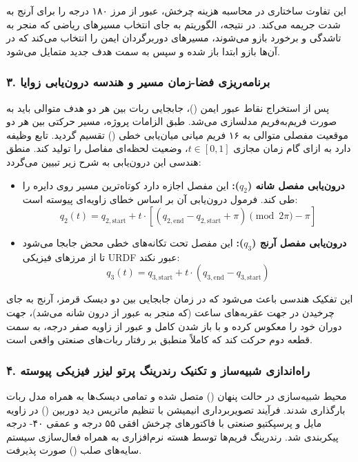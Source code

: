 \documentclass{article}
\begin{document}
این تفاوت ساختاری در محاسبه هزینه چرخش، عبور از مرز ۱۸۰ درجه را برای آرنج به شدت جریمه می‌کند. در نتیجه، الگوریتم به جای انتخاب مسیرهای ریاضی که منجر به تاشدگی و برخورد بازو می‌شوند، مسیرهای دوربرگردان ایمن را انتخاب می‌کند که در آن‌ها بازو ابتدا باز شده و سپس به سمت هدف جدید متمایل می‌شود.

\subsubsection*{۳. برنامه‌ریزی فضا-زمان مسیر و هندسه درون‌یابی زوایا}

پس از استخراج نقاط عبور ایمن ()، جابجایی ربات بین هر دو هدف متوالی باید به صورت فریم‌به‌فریم مدلسازی می‌شد. طبق الزامات پروژه، مسیر حرکتی بین هر دو موقعیت مفصلی متوالی به ۱۶ فریم میانی میان‌یابی خطی () تقسیم گردید. تابع  وظیفه دارد به ازای گام زمان مجازی $t \in [0, 1]$، وضعیت لحظه‌ای مفاصل را تولید کند. منطق هندسی این درون‌یابی به شرح زیر تبیین می‌گردد:

\begin{itemize}
	\item \textbf{درون‌یابی مفصل شانه ($q_2$):} این مفصل اجازه دارد کوتاه‌ترین مسیر روی دایره را طی کند. فرمول درون‌یابی آن بر اساس خطای زاویه‌ای پیوسته است:
	\begin{equation}
		q_2(t) = q_{2, \text{start}} + t \cdot \left[ (q_{2, \text{end}} - q_{2, \text{start}} + \pi) \pmod{2\pi} - \pi \right]
	\end{equation}
	\item \textbf{درون‌یابی مفصل آرنج ($q_3$):} این مفصل تحت تکانه‌های خطی محض جابجا می‌شود تا از مرزهای فیزیکی URDF عبور نکند:
	\begin{equation}
		q_3(t) = q_{3, \text{start}} + t \cdot (q_{3, \text{end}} - q_{3, \text{start}})
	\end{equation}
\end{itemize}
این تفکیک هندسی باعث می‌شود که در زمان جابجایی بین دو دیسک قرمز، آرنج به جای چرخیدن در جهت عقربه‌های ساعت (که منجر به عبور از درون شانه می‌شد)، جهت دوران خود را معکوس کرده و با باز شدن کامل و عبور از زاویه صفر درجه، به سمت قطعه دوم حرکت کند که کاملاً منطبق بر رفتار ربات‌های صنعتی واقعی است.

\subsubsection*{۴. راه‌اندازی شبیه‌ساز و تکنیک رندرینگ پرتو لیزر فیزیکی پیوسته}

محیط شبیه‌سازی در حالت پنهان () متصل شده و تمامی دیسک‌ها به همراه مدل ربات بارگذاری شدند. فرآیند تصویربرداری انیمیشن با تنظیم ماتریس دید دوربین () در زاویه مایل و پرسپکتیو صنعتی با فاکتورهای چرخش افقی ۵۵ درجه و عمقی ۴۰- درجه پیکربندی شد. رندرینگ فریم‌ها توسط هسته نرم‌افزاری  به همراه فعال‌سازی سیستم سایه‌های صلب () صورت پذیرفت.
\end{document}
